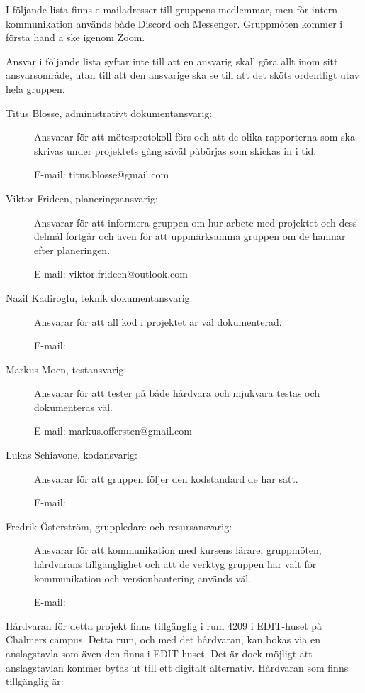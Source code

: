 \documentclass{article}
\begin{document}
I följande lista finns e-mailadresser till gruppens medlemmar, men för intern kommunikation används både Discord och Messenger. Gruppmöten kommer i första hand a ske igenom Zoom.

Ansvar i följande lista syftar inte till att en ansvarig skall göra allt inom sitt ansvarsområde, utan till att den ansvarige ska se till att det sköts ordentligt utav hela gruppen.

\begin{description}
    \item[Titus Blosse, administrativt dokumentansvarig:] Ansvarar för att mötesprotokoll förs och att de olika rapporterna som ska skrivas under projektets gång såväl påbörjas som skickas in i tid.
    
    E-mail: titus.blosse@gmail.com
    
    \item[Viktor Frideen, planeringsansvarig:] Ansvarar för att informera gruppen om hur arbete med projektet och dess delmål fortgår och även för att uppmärksamma gruppen om de hamnar efter planeringen.
    
    E-mail: viktor.frideen@outlook.com
    
    \item[Nazif Kadiroglu, teknik dokumentansvarig:] Ansvarar för att all kod i projektet är väl dokumenterad.
    
    E-mail: 
    
    \item[Markus Moen, testansvarig:] Ansvarar för att tester på både hårdvara och mjukvara testas och dokumenteras väl.
    
    E-mail: markus.offersten@gmail.com
    
    \item[Lukas Schiavone, kodansvarig:] Ansvarar för att gruppen följer den kodstandard de har satt.
    
    E-mail: 
    
    \item[Fredrik Österström, gruppledare och resursansvarig:] Ansvarar för att kommunikation med kursens lärare, gruppmöten, hårdvarans tillgänglighet och att de verktyg gruppen har valt för kommunikation och versionhantering används väl.
    
    E-mail: 
\end{description}

Hårdvaran för detta projekt finns tillgänglig i rum 4209 i EDIT-huset på Chalmers campus. Detta rum, och med det hårdvaran, kan bokas via en anslagstavla som även den finns i EDIT-huset. Det är dock möjligt att anslagstavlan kommer bytas ut till ett digitalt alternativ. Hårdvaran som finns tillgänglig är: 
\end{document}
